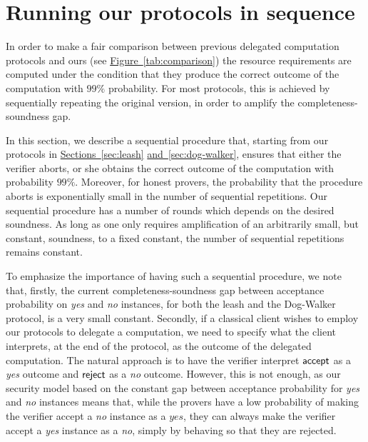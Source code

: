 \documentclass[11pt]{article}
\numberwithin{equation}{section}
\theoremstyle{definition}
\theoremstyle{plain}
\newcommand{\expref}[2]{\hyperref[#2]{#1~\ref{#2}}}
\begin{document}
 


\section{Running our protocols in sequence}
\label{sec:sequential}

In order to make a fair comparison between previous delegated computation protocols and ours (see \expref{Figure}{tab:comparison}) the resource requirements are computed under the condition that they produce the correct outcome of the computation with $99\%$ probability. For most protocols, this is achieved by sequentially repeating the original version, in order to amplify the completeness-soundness gap. 

In this section, we describe a sequential procedure that, starting from our protocols in \expref{Sections}{sec:leash} \expref{and}{sec:dog-walker}, ensures that either the verifier aborts, or she obtains the correct outcome of the computation with probability $99\%$. Moreover, for honest provers, the probability that the procedure aborts is exponentially small in the number of sequential repetitions. Our sequential procedure has a number of rounds which depends on the desired soundness. As long as one only requires amplification of an arbitrarily small, but constant, soundness, to a fixed constant, the number of sequential repetitions remains constant.

To emphasize the importance of having such a sequential procedure, we note that, firstly, the current completeness-soundness gap between acceptance probability on \textit{yes} and \textit{no} instances, for both the leash and the Dog-Walker protocol, is a very small constant. Secondly, if a classical client wishes to employ our protocols to delegate a computation, we need to specify what the client interprets, at the end of the protocol, as the outcome of the delegated computation. The natural approach is to have the verifier interpret $\sf accept$ as a \textit{yes} outcome and $\sf reject$ as a \textit{no} outcome. However, this is not enough, as our security model based on the constant gap between acceptance probability for \textit{yes} and \textit{no} instances means that, while the provers have a low probability of making the verifier accept a \textit{no} instance as a $\textit{yes}$, they can always make the verifier accept a \textit{yes} instance as a \textit{no}, simply by behaving so that they are rejected.
\end{document}
